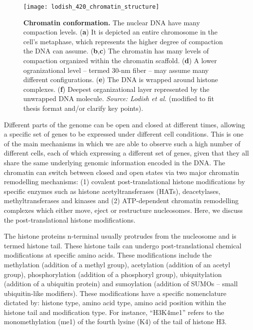 \begin{figure}[h!]
\centering
\texttt{[image: lodish\_420\_chromatin\_structure]}
\caption[Chromatin conformation]{\textbf{Chromatin conformation.} The nuclear DNA have many compaction levels. (\textbf{a}) It is depicted an entire chromosome in the cell's metaphase, which represents the higher degree of compaction the DNA can assume. (\textbf{b},\textbf{c}) The chromatin has many levels of compaction organized within the chromatin scaffold. (\textbf{d}) A lower ogranizational level -- termed $30$-nm fiber -- may assume many different configurations. (\textbf{e}) The DNA is wrapped around histone complexes. (\textbf{f}) Deepest organizational layer represented by the unwrapped DNA molecule. \emph{Source: Lodish et al.}\cite{lodish2007} (modified to fit thesis format and/or clarify key points).}
\label{fig:lodish_chromatin_structure}
\end{figure}

Different parts of the genome can be open and closed at different times, allowing a specific set of genes to be expressed under different cell conditions. This is one of the main mechanisms in which we are able to observe such a high number of different cells, each of which expressing a different set of genes, given that they all share the same underlying genomic information encoded in the DNA. The chromatin can switch between closed and open states via two major chromatin remodelling mechanisms: (1) covalent post-translational histone modifications by specific enzymes such as histone acetyltransferases (HATs), deacetylases, methyltransferases and kinases and (2) ATP-dependent chromatin remodelling complexes which either move, eject or restructure nucleosomes. Here, we discuss the post-translational histone modifications.

The histone proteins n-terminal usually protrudes from the nucleosome and is termed histone tail. These histone tails can undergo post-translational chemical modifications at specific amino acids. These modifications include the methylation (addition of a methyl group), acetylation (addition of an acetyl group), phosphorylation (addition of a phosphoryl group), ubiquitylation (addition of a ubiquitin protein) and sumoylation (addition of SUMOs -- small ubiquitin-like modifiers). These modifications have a specific nomenclature dictated by: histone type, amino acid type, amino acid position within the histone tail and modification type. For instance, ``H3K4me1'' refers to the monomethylation (me1) of the fourth lysine (K4) of the tail of histone H3.

